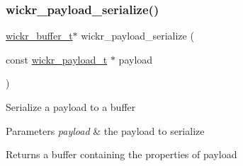 \subsubsection{\texorpdfstring{wickr\_payload\_serialize()}{wickr\_payload\_serialize()}}
{\footnotesize\ttfamily \mbox{\hyperlink{structwickr__buffer}{wickr\+\_\+buffer\+\_\+t}}$\ast$ wickr\+\_\+payload\+\_\+serialize (\begin{DoxyParamCaption}\item[{const \mbox{\hyperlink{structwickr__payload}{wickr\+\_\+payload\+\_\+t}} $\ast$}]{payload }\end{DoxyParamCaption})}

Serialize a payload to a buffer


\begin{DoxyParams}{Parameters}
{\em payload} & the payload to serialize \\
\hline
\end{DoxyParams}
\begin{DoxyReturn}{Returns}
a buffer containing the properties of \textquotesingle{}payload\textquotesingle{} 
\end{DoxyReturn}
